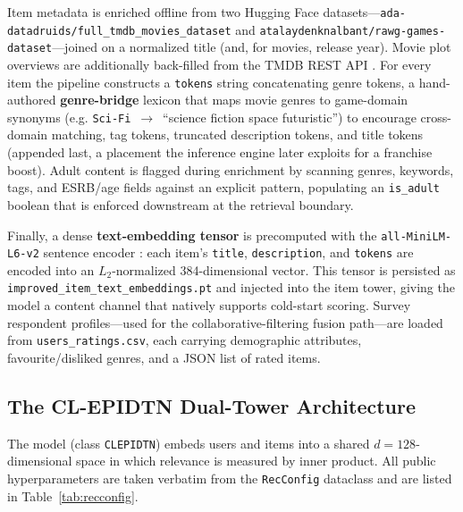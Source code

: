Item metadata is enriched offline from two Hugging Face datasets---\texttt{ada-datadruids/\allowbreak full\_\allowbreak tmdb\_\allowbreak movies\_\allowbreak dataset} and \texttt{atalaydenknalbant/\allowbreak rawg-games-dataset}---joined on a normalized title (and, for movies, release year). Movie plot overviews are additionally back-filled from the TMDB REST API \cite{tmdb_ref}. For every item the pipeline constructs a \texttt{tokens} string concatenating genre tokens, a hand-authored \textbf{genre-bridge} lexicon that maps movie genres to game-domain synonyms (e.g. \texttt{Sci-Fi}~$\rightarrow$~``science fiction space futuristic'') to encourage cross-domain matching, tag tokens, truncated description tokens, and title tokens (appended last, a placement the inference engine later exploits for a franchise boost). Adult content is flagged during enrichment by scanning genres, keywords, tags, and ESRB/age fields against an explicit pattern, populating an \texttt{is\_adult} boolean that is enforced downstream at the retrieval boundary.

Finally, a dense \textbf{text-embedding tensor} is precomputed with the \texttt{all-MiniLM-L6-v2} sentence encoder \cite{wang2020minilm, reimers2019sentencebert}: each item's \texttt{title}, \texttt{description}, and \texttt{tokens} are encoded into an $L_2$-normalized 384-dimensional vector. This tensor is persisted as \texttt{improved\_\allowbreak item\_\allowbreak text\_\allowbreak embeddings.pt} and injected into the item tower, giving the model a content channel that natively supports cold-start scoring. Survey respondent profiles---used for the collaborative-filtering fusion path---are loaded from \texttt{users\_ratings.csv}, each carrying demographic attributes, favourite/disliked genres, and a JSON list of rated items.

\subsection{The CL-EPIDTN Dual-Tower Architecture}
The model (class \texttt{CLEPIDTN}) embeds users and items into a shared $d = 128$-dimensional space in which relevance is measured by inner product. All public hyperparameters are taken verbatim from the \texttt{RecConfig} dataclass and are listed in Table~\ref{tab:recconfig}.

